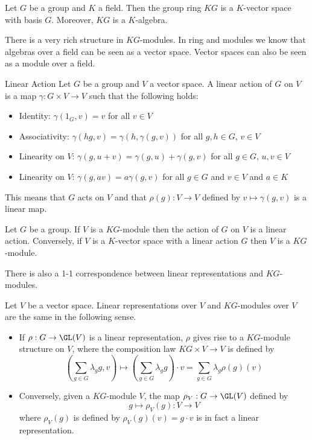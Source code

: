 \documentclass[a4paper]{article}
\begin{document}
\begin{lmm}{}{} Let $G$ be a group and $K$ a field. Then the group ring $KG$ is a $K$-vector space with basis $G$. Moreover, $KG$ is a $K$-algebra. 
\end{lmm}

There is a very rich structure in $KG$-modules. In ring and modules we know that algebras over a field can be seen as a vector space. Vector spaces can also be seen as a module over a field. 

\begin{defn}{Linear Action}{} Let $G$ be a group and $V$ a vector space. A linear action of $G$ on $V$ is a map $\gamma:G\times V\to V$ such that the following holds: 
\begin{itemize}
\item Identity: $\gamma(1_G,v)=v$ for all $v\in V$
\item Associativity: $\gamma(hg,v)=\gamma(h,\gamma(g,v))$ for all $g,h\in G$, $v\in V$
\item Linearity on $V$: $\gamma(g,u+v)=\gamma(g,u)+\gamma(g,v)$ for all $g\in G$, $u,v\in V$
\item Linearity on $V$: $\gamma(g,av)=a\gamma(g,v)$ for all $g\in G$ and $v\in V$ and $a\in K$
\end{itemize}
This means that $G$ acts on $V$ and that $\rho(g):V\to V$ defined by $v\mapsto\gamma(g,v)$ is a linear map. 
\end{defn}

\begin{prp}{}{} Let $G$ be a group. If $V$ is a $KG$-module then the action of $G$ on $V$ is a linear action. Conversely, if $V$ is a $K$-vector space with a linear action $G$ then $V$ is a $KG$-module. 
\end{prp}

There is also a 1-1 correspondence between linear representations and $KG$-modules. 

\begin{thm}{}{} Let $V$ be a vector space. Linear representations over $V$ and $KG$-modules over $V$ are the same in the following sense. 
\begin{itemize}
\item If $\rho:G\to\GL(V)$ is a linear representation, $\rho$ gives rise to a $KG$-module structure on $V$, where the composition law $KG\times V\to V$ is defined by $$\left(\sum_{g\in G}\lambda_gg,v\right)\mapsto\left(\sum_{g\in G}\lambda_gg\right)\cdot v=\sum_{g\in G}\lambda_g\rho(g)(v)$$
\item Conversely, given a $KG$-module $V$, the map $\rho_V:G\to\GL(V)$ defined by $$g\mapsto\rho_V(g):V\to V$$ where $\rho_V(g)$ is defined by $\rho_V(g)(v)=g\cdot v$ is in fact a linear representation. 
\end{itemize}
\end{thm}
\end{document}
